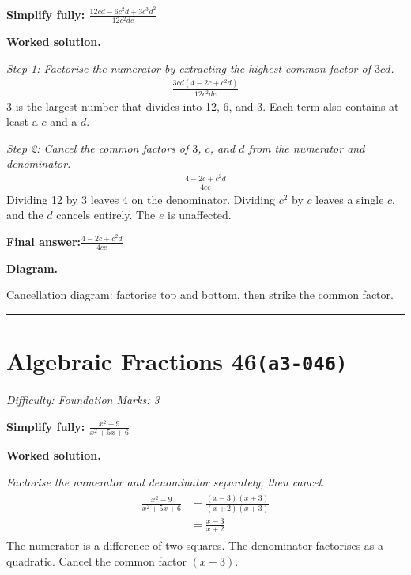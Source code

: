 \documentclass[11pt]{article}
\newcommand{\question}[1]{\par\medskip\noindent\textbf{#1}\par}
\begin{document}
\question{Simplify fully: \( \frac{12cd - 6c^2d + 3c^3d^2}{12c^2de} \)}

\textbf{Worked solution.}

\textit{Step 1: Factorise the numerator by extracting the highest common factor of \( 3cd \).}
\[\begin{gathered}
\frac{3cd(4 - 2c + c^2d)}{12c^2de}
\end{gathered}\]
3 is the largest number that divides into 12, 6, and 3. Each term also contains at least a \( c \) and a \( d \).

\textit{Step 2: Cancel the common factors of \( 3 \), \( c \), and \( d \) from the numerator and denominator.}
\[\begin{gathered}
\frac{4 - 2c + c^2d}{4ce}
\end{gathered}\]
Dividing 12 by 3 leaves 4 on the denominator. Dividing \( c^2 \) by \( c \) leaves a single \( c \), and the \( d \) cancels entirely. The \( e \) is unaffected.

\begin{answerbox}
\textbf{Final answer:}\quad \(\displaystyle \frac{4 - 2c + c^2d}{4ce}\)
\end{answerbox}
\textbf{Diagram.}

\begin{center}
\end{center}
\small Cancellation diagram: factorise top and bottom, then strike the common factor.\normalsize

\medskip\hrule

\section*{Algebraic Fractions 46\quad\small\texttt{(a3-046)}}
\textit{Difficulty: Foundation \quad\textbar\quad Marks: 3}

\question{Simplify fully: \( \frac{x^2 - 9}{x^2 + 5x + 6} \)}

\textbf{Worked solution.}

\textit{Factorise the numerator and denominator separately, then cancel.}
\[\begin{gathered}
\begin{aligned} \frac{x^2 - 9}{x^2 + 5x + 6} &= \frac{(x-3)(x+3)}{(x+2)(x+3)} \\ &= \frac{x-3}{x+2} \end{aligned}
\end{gathered}\]
The numerator is a difference of two squares. The denominator factorises as a quadratic. Cancel the common factor \((x+3)\).
\end{document}
